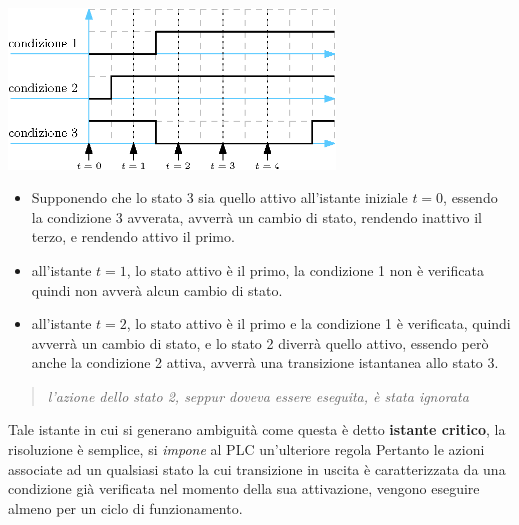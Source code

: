 \documentclass[10pt, letterpaper]{report}
\begin{document}
\begin{center}
    \includegraphics[width=0.65\textwidth ]{images/condizioni.eps}
\end{center}\begin{itemize}
    \item 
    Supponendo che lo stato 3 sia quello attivo all'istante iniziale $t=0$, essendo la condizione 3 avverata, avverrà un cambio di stato, rendendo inattivo il terzo, e rendendo attivo il primo.
    \item all'istante $t=1$, lo stato attivo è il primo, la condizione 1 non è verificata quindi non avverà alcun cambio di stato.
    \item all'istante $t=2$, lo stato attivo è il primo e la condizione 1 è verificata, quindi avverrà un cambio di stato, e lo stato 2 diverrà quello attivo, essendo però anche la condizione 2 attiva, avverrà una transizione istantanea allo stato 3. 
\end{itemize}
\begin{quotation}
    \textit{l'azione dello stato 2, seppur doveva essere eseguita, è stata ignorata}
\end{quotation}
Tale istante in cui si generano ambiguità come questa è detto \textbf{istante critico}, la risoluzione è semplice, si \textit{impone} al PLC un'ulteriore regola 
Pertanto le azioni associate ad un qualsiasi stato la cui transizione in uscita è
caratterizzata da una condizione già verificata nel momento della sua attivazione,
vengono eseguire almeno per un ciclo di funzionamento. 
\flowerLine
\end{document}
